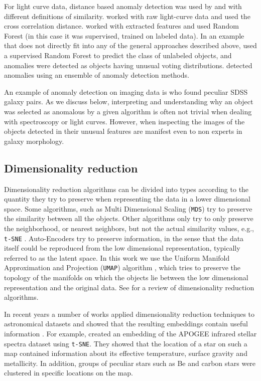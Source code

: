 \documentclass[fleqn,usenatbib]{mnras}
\begin{document}
For light curve data, distance based anomaly detection was used by \citet{protopapas06} and \citet{richards12} with different definitions of similarity. \citet{protopapas06} worked with raw light-curve data and used the cross correlation distance. \citet{richards12} worked with extracted features and used Random Forest (in this case it was supervised, trained on labeled data). In an example that does not directly fit into any of the general approaches described above, \citet{nun14} used a supervised Random Forest to predict the class of unlabeled objects, and anomalies were detected as objects having unusual voting distributions. \citet{nun16} detected anomalies using an ensemble of anomaly detection methods. 

An example of anomaly detection on imaging data is \citet{shamir14} who found peculiar SDSS galaxy pairs. As we discuss below, interpreting and understanding why an object was selected as anomalous by a given algorithm is often not trivial when dealing with spectroscopy or light curves. However, when inspecting the images of the objects detected in \citet{shamir14} their unusual features are manifest even to non experts in galaxy morphology. 


\subsection{Dimensionality reduction}
Dimensionality reduction algorithms can be divided into types according to the quantity they try to preserve when representing the data in a lower dimensional space. Some algorithms, such as Multi Dimensional Scaling (\texttt{MDS}) try to preserve the similarity between all the objects. Other algorithms only try to only preserve the neighborhood, or nearest neighbors, but not the actual similarity values, e.g.,  \texttt{t-SNE} \citep{maaten08}. Auto-Encoders try to preserve information, in the sense that the data itself could be reproduced from the low dimensional representation, typically referred to as the latent space. In this work we use the Uniform Manifold Approximation and Projection (\texttt{UMAP}) algorithm \citep{umap}, which tries to preserve the topology of the manifolds on which the objects lie between the low dimensional representation and the original data. See \citet{gisbrecht15} for a review of dimensionality reduction algorithms. 

In recent years a number of works applied  dimensionality reduction techniques to astronomical datasets and showed that the resulting embeddings contain useful information \citep[][]{in-der-au12, meusinger12, jofre15, traven17, anders18, reis18}.  For example, \citet{reis18} created an  embedding of the APOGEE \citep{majewski16} infrared stellar spectra dataset using \texttt{t-SNE}. They showed that the location of a star on such a map contained information about its effective temperature,  surface gravity and  metallicity. In addition, groups of peculiar stars such as Be and carbon stars were clustered in specific locations on the map. 
\end{document}
